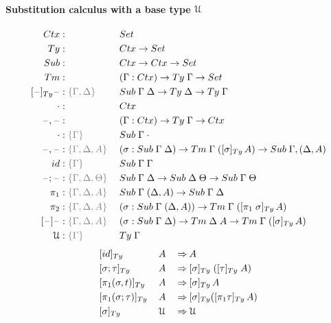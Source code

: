 \documentclass[a4paper,UKenglish,numberwithinsect,cleveref,thm-restate]{lipics-v2021}
\begin{document}
\paragraph*{Substitution calculus with a base type $\mathcal{U}$}
\begin{alignat*}{3}
  \Ctx      & : && \Set                   \\
  \Ty       & : && \Ctx \to \Set          \\
  \Sub      & : && \Ctx \to \Ctx \to \Set \\
  \Tm       & : && (\Gamma : \Ctx) \to \Ty\;\Gamma \to \Set \\
  [\blank]_{\Ty}\blank & : \implicit{\Gamma, \Delta}\; && \Sub\;\Gamma\;\Delta \to \Ty\;\Delta \to \Ty\;\Gamma \\
  \emptyctx & : && \Ctx \\
  \blank,\blank & : && (\Gamma : \Ctx) \to \Ty\;\Gamma \to \Ctx \\
  \emptysub & : \implicit{\Gamma} && \Sub\;\Gamma\;\emptyctx \\
  \blank,\blank & : \implicit{\Gamma, \Delta, A} && (\sigma : \Sub\;\Gamma\;\Delta) \to \Tm\;\Gamma\;([ \sigma ]_{\Ty}\,A) \to \Sub\;\Gamma,(\Delta, A) \\
  \idS & : \implicit{\Gamma} && \Sub\;\Gamma\;\Gamma \\
  \blank;\blank & : \implicit{\Gamma, \Delta, \Theta} && \Sub\;\Gamma\;\Delta \to \Sub\;\Delta\;\Theta \to \Sub\;\Gamma\;\Theta \\
  \pi_1 & : \implicit{\Gamma, \Delta, A}\; && \Sub\;\Gamma\;(\Delta, A) \to \Sub\;\Gamma\;\Delta \\
  \pi_2 & : \implicit{\Gamma, \Delta, A}\; && (\sigma : \Sub\;\Gamma\;(\Delta, A)) \to \Tm\;\Gamma\;([ \pi_1\;\sigma ]_{\Ty}\, A) \\
  [\blank] \blank & : \implicit{\Gamma,\Delta, A} && (\sigma : \Sub\;\Gamma\;\Delta) \to \Tm\;\Delta\;A \to \Tm\;\Gamma\;([\sigma]_{\Ty}\, A) \\
  \UU     & : \implicit{\Gamma}\; && \Ty\; \Gamma
\end{alignat*}
\begin{alignat*}{5}
  & [ \idS ]_{\Ty}\,               && A           && \reduce A \\
  & [ \sigma ; \tau ]_{\Ty}\,      && A           && \reduce [ \sigma ]_{\Ty}\;([ \tau ]_{\Ty}\;A) \\
  & [ \pi_1(\sigma, t) ]_{\Ty}\,   && A           && \reduce [\sigma]_\Ty\,A \\
  & [ \pi_1(\sigma; \tau) ]_{\Ty}\,&& A           && \reduce [\sigma]_\Ty ([\pi_1\tau]_\Ty \,A) \\
  & [ \sigma ]_{\Ty}\,             && \UU         && \reduce \UU
\end{alignat*}
\end{document}
